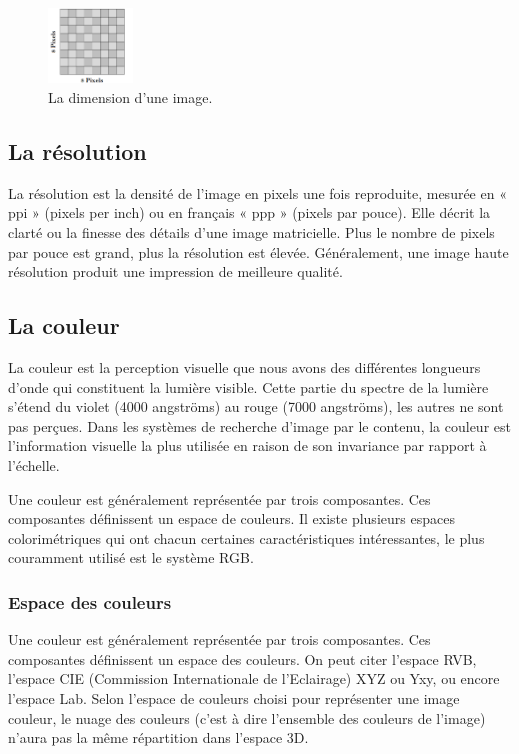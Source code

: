 \begin{figure}[H]
	\centering
	\includegraphics[width=0.2\textwidth]{Figures/dim} 
	\caption{La dimension d’une image.}
\end{figure}

\subsection{La résolution}
La résolution est la densité de l’image en pixels une fois reproduite,
mesurée en « ppi » (pixels per inch) ou en français « ppp » (pixels par pouce).
Elle décrit la clarté ou la finesse des détails d’une image matricielle. Plus le nombre de pixels par pouce est grand, plus la résolution est élevée.
Généralement, une image haute résolution produit une impression de
meilleure qualité.

\subsection{La couleur}
La couleur est la perception visuelle que nous avons des différentes
longueurs d’onde qui constituent la lumière visible. Cette partie du spectre
de la lumière s'étend du violet (4000 angströms) au rouge (7000 angströms),
les autres ne sont pas perçues.
Dans les systèmes de recherche d’image par le contenu, la couleur est
l'information visuelle la plus utilisée en raison de son invariance par rapport à l'échelle. 

Une couleur est généralement représentée par trois composantes. Ces composantes définissent un espace de couleurs. Il existe plusieurs espaces colorimétriques qui ont chacun certaines caractéristiques
intéressantes, le plus couramment utilisé est le système RGB.
\subsubsection{Espace des couleurs}
Une couleur est généralement représentée par trois composantes. Ces composantes définissent un espace des couleurs. On peut citer l'espace RVB, l'espace CIE (Commission Internationale de l'Eclairage) XYZ ou Yxy, ou encore l'espace Lab. Selon l'espace de couleurs choisi pour représenter une image couleur, le nuage des couleurs (c'est à dire l'ensemble des couleurs de l'image) n'aura pas la même répartition dans l'espace 3D.

